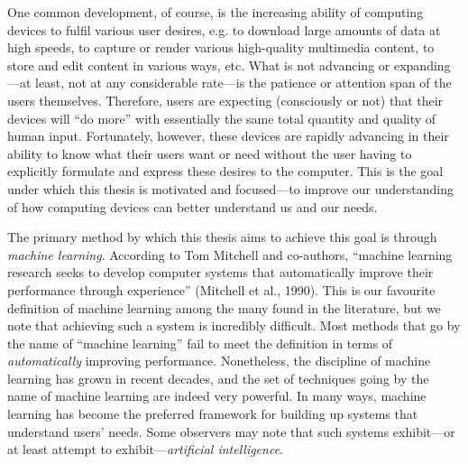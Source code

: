 One common development, of course, is the increasing ability of computing devices to fulfil various user desires, e.g. to download large amounts of data at high speeds, to capture or render various high-quality multimedia content, to store and edit content in various ways, etc. What is not advancing or expanding---at least, not at any considerable rate---is the patience or attention span of the users themselves. Therefore, users are expecting (consciously or not) that their devices will ``do more'' with essentially the same total quantity and quality of human input. Fortunately, however, these devices are rapidly advancing in their ability to know what their users want or need without the user having to explicitly formulate and express these desires to the computer. This is the goal under which this thesis is motivated and focused---to improve our understanding of how computing devices can better understand us and our needs.

The primary method by which this thesis aims to achieve this goal is through \emph{machine learning}. According to Tom Mitchell and co-authors, ``machine learning research seeks to develop computer systems that automatically improve their performance through experience'' (Mitchell et al., 1990). This is our favourite definition of machine learning among the many found in the literature, but we note that achieving such a system is incredibly difficult. Most methods that go by the name of ``machine learning'' fail to meet the definition in terms of \emph{automatically} improving performance. Nonetheless, the discipline of machine learning has grown in recent decades, and the set of techniques going by the name of machine learning are indeed very powerful. In many ways, machine learning has become the preferred framework for building up systems that understand users' needs. Some observers may note that such systems exhibit---or at least attempt to exhibit---\emph{artificial intelligence}.

